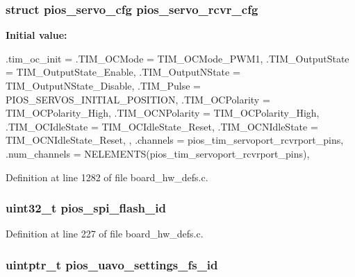 \hypertarget{group___flying_f4_gaa111328ef9a12c806ed1c24b93d4f663}{
\subsubsection[{pios\-\_\-servo\-\_\-rcvr\-\_\-cfg}]{\setlength{\rightskip}{0pt plus 5cm}struct {\bf pios\-\_\-servo\-\_\-cfg} {\bf pios\-\_\-servo\-\_\-rcvr\-\_\-cfg}}}\label{group___flying_f4_gaa111328ef9a12c806ed1c24b93d4f663}
{\bfseries \-Initial value\-:}
\begin{DoxyCode}
 {
        .tim_oc_init = {
                .TIM_OCMode = TIM_OCMode_PWM1,
                .TIM_OutputState = TIM_OutputState_Enable,
                .TIM_OutputNState = TIM_OutputNState_Disable,
                .TIM_Pulse = PIOS_SERVOS_INITIAL_POSITION,
                .TIM_OCPolarity = TIM_OCPolarity_High,
                .TIM_OCNPolarity = TIM_OCPolarity_High,
                .TIM_OCIdleState = TIM_OCIdleState_Reset,
                .TIM_OCNIdleState = TIM_OCNIdleState_Reset,
        },
        .channels = pios_tim_servoport_rcvrport_pins,
        .num_channels = NELEMENTS(pios_tim_servoport_rcvrport_pins),
}
\end{DoxyCode}


\-Definition at line 1282 of file board\-\_\-hw\-\_\-defs.\-c.

\hypertarget{group___flying_f4_gaebc54f2c5fc298fad979df4d9bd1414b}{
\subsubsection[{pios\-\_\-spi\-\_\-flash\-\_\-id}]{\setlength{\rightskip}{0pt plus 5cm}uint32\-\_\-t {\bf pios\-\_\-spi\-\_\-flash\-\_\-id}}}\label{group___flying_f4_gaebc54f2c5fc298fad979df4d9bd1414b}


\-Definition at line 227 of file board\-\_\-hw\-\_\-defs.\-c.

\hypertarget{group___flying_f4_gab060f441dd600b08386c0ca1b487217a}{
\subsubsection[{pios\-\_\-uavo\-\_\-settings\-\_\-fs\-\_\-id}]{\setlength{\rightskip}{0pt plus 5cm}uintptr\-\_\-t {\bf pios\-\_\-uavo\-\_\-settings\-\_\-fs\-\_\-id}}}\label{group___flying_f4_gab060f441dd600b08386c0ca1b487217a}


